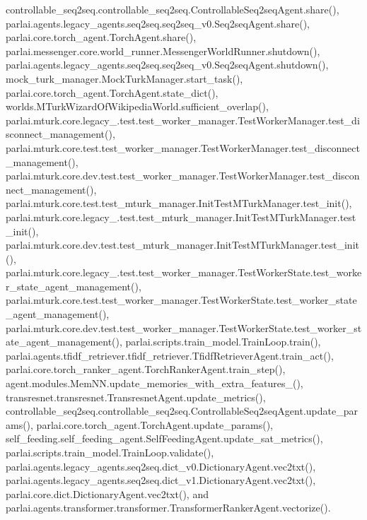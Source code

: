 controllable\+\_\+seq2seq.\+controllable\+\_\+seq2seq.\+Controllable\+Seq2seq\+Agent.\+share(), parlai.\+agents.\+legacy\+\_\+agents.\+seq2seq.\+seq2seq\+\_\+v0.\+Seq2seq\+Agent.\+share(), parlai.\+core.\+torch\+\_\+agent.\+Torch\+Agent.\+share(), parlai.\+messenger.\+core.\+world\+\_\+runner.\+Messenger\+World\+Runner.\+shutdown(), parlai.\+agents.\+legacy\+\_\+agents.\+seq2seq.\+seq2seq\+\_\+v0.\+Seq2seq\+Agent.\+shutdown(), mock\+\_\+turk\+\_\+manager.\+Mock\+Turk\+Manager.\+start\+\_\+task(), parlai.\+core.\+torch\+\_\+agent.\+Torch\+Agent.\+state\+\_\+dict(), worlds.\+M\+Turk\+Wizard\+Of\+Wikipedia\+World.\+sufficient\+\_\+overlap(), parlai.\+mturk.\+core.\+legacy\+\_.\+test.\+test\+\_\+worker\+\_\+manager.\+Test\+Worker\+Manager.\+test\+\_\+disconnect\+\_\+management(), parlai.\+mturk.\+core.\+test.\+test\+\_\+worker\+\_\+manager.\+Test\+Worker\+Manager.\+test\+\_\+disconnect\+\_\+management(), parlai.\+mturk.\+core.\+dev.\+test.\+test\+\_\+worker\+\_\+manager.\+Test\+Worker\+Manager.\+test\+\_\+disconnect\+\_\+management(), parlai.\+mturk.\+core.\+test.\+test\+\_\+mturk\+\_\+manager.\+Init\+Test\+M\+Turk\+Manager.\+test\+\_\+init(), parlai.\+mturk.\+core.\+legacy\+\_.\+test.\+test\+\_\+mturk\+\_\+manager.\+Init\+Test\+M\+Turk\+Manager.\+test\+\_\+init(), parlai.\+mturk.\+core.\+dev.\+test.\+test\+\_\+mturk\+\_\+manager.\+Init\+Test\+M\+Turk\+Manager.\+test\+\_\+init(), parlai.\+mturk.\+core.\+legacy\+\_.\+test.\+test\+\_\+worker\+\_\+manager.\+Test\+Worker\+State.\+test\+\_\+worker\+\_\+state\+\_\+agent\+\_\+management(), parlai.\+mturk.\+core.\+test.\+test\+\_\+worker\+\_\+manager.\+Test\+Worker\+State.\+test\+\_\+worker\+\_\+state\+\_\+agent\+\_\+management(), parlai.\+mturk.\+core.\+dev.\+test.\+test\+\_\+worker\+\_\+manager.\+Test\+Worker\+State.\+test\+\_\+worker\+\_\+state\+\_\+agent\+\_\+management(), parlai.\+scripts.\+train\+\_\+model.\+Train\+Loop.\+train(), parlai.\+agents.\+tfidf\+\_\+retriever.\+tfidf\+\_\+retriever.\+Tfidf\+Retriever\+Agent.\+train\+\_\+act(), parlai.\+core.\+torch\+\_\+ranker\+\_\+agent.\+Torch\+Ranker\+Agent.\+train\+\_\+step(), agent.\+modules.\+Mem\+N\+N.\+update\+\_\+memories\+\_\+with\+\_\+extra\+\_\+features\+\_\+(), transresnet.\+transresnet.\+Transresnet\+Agent.\+update\+\_\+metrics(), controllable\+\_\+seq2seq.\+controllable\+\_\+seq2seq.\+Controllable\+Seq2seq\+Agent.\+update\+\_\+params(), parlai.\+core.\+torch\+\_\+agent.\+Torch\+Agent.\+update\+\_\+params(), self\+\_\+feeding.\+self\+\_\+feeding\+\_\+agent.\+Self\+Feeding\+Agent.\+update\+\_\+sat\+\_\+metrics(), parlai.\+scripts.\+train\+\_\+model.\+Train\+Loop.\+validate(), parlai.\+agents.\+legacy\+\_\+agents.\+seq2seq.\+dict\+\_\+v0.\+Dictionary\+Agent.\+vec2txt(), parlai.\+agents.\+legacy\+\_\+agents.\+seq2seq.\+dict\+\_\+v1.\+Dictionary\+Agent.\+vec2txt(), parlai.\+core.\+dict.\+Dictionary\+Agent.\+vec2txt(), and parlai.\+agents.\+transformer.\+transformer.\+Transformer\+Ranker\+Agent.\+vectorize().

